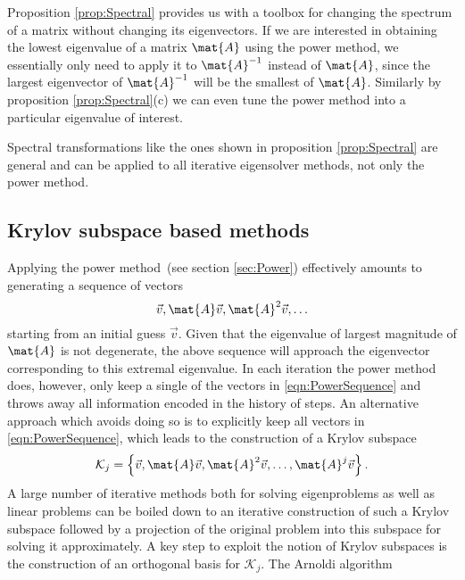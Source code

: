 Proposition \ref{prop:Spectral} provides us with a toolbox for
changing the spectrum of a matrix without changing its eigenvectors.
If we are interested in obtaining the lowest eigenvalue of a matrix $\mat{A}$
using the power method,
we essentially only need to apply it to $\mat{A}^{-1}$ instead
of  $\mat{A}$, since the largest eigenvector of $\mat{A}^{-1}$ will be
the smallest of $\mat{A}$.
Similarly by proposition \ref{prop:Spectral}(c)
we can even tune the power method into a particular eigenvalue of interest.

Spectral transformations like the ones shown in proposition \ref{prop:Spectral}
are general and can be applied to all iterative eigensolver methods,
not only the power method.


\subsection{Krylov subspace based methods}
\label{sec:Arnoldi}
Applying the power method~(see section \ref{sec:Power})
effectively amounts to generating a sequence of vectors
\begin{equation}
	\vec{v}, \mat{A} \vec{v}, \mat{A}^2 \vec{v}, \ldots
	\label{eqn:PowerSequence}
\end{equation}
starting from an initial guess $\vec{v}$.
Given that the eigenvalue of largest magnitude of $\mat{A}$ is not degenerate,
the above sequence will approach the eigenvector corresponding to this
extremal eigenvalue.
In each iteration the power method does, however,
only keep a single of the vectors in \eqref{eqn:PowerSequence}
and throws away all information encoded in the history of steps.
An alternative approach which avoids doing so is
to explicitly keep all vectors in \eqref{eqn:PowerSequence},
which leads to the construction of a Krylov subspace~\cite{Arbenz2010}
\begin{equation}
	\mathcal{K}_j = \left\{\vec{v}, \mat{A} \vec{v}, \mat{A}^2 \vec{v},
	\ldots, \mat{A}^j \vec{v} \right\}.
	\label{eqn:KrylovSubspace}
\end{equation}
A large number of iterative methods both for solving eigenproblems
as well as linear problems
can be boiled down to an iterative construction of such a
Krylov subspace followed by a projection of the original problem
into this subspace for solving it approximately.
A key step to exploit the notion of Krylov subspaces
is the construction of an orthogonal basis for $\mathcal{K}_j$.
The Arnoldi algorithm~\cite{Arnoldi1951}
